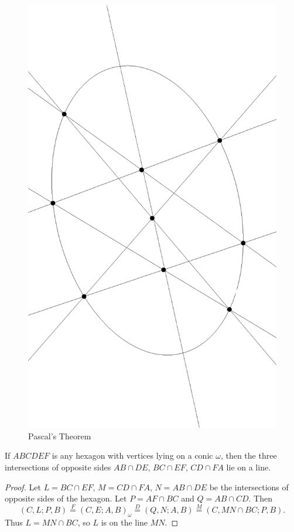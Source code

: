 \begin{figure}[!htb]
\centering
\includegraphics[scale=.5,angle=90]{pascal.eps}
\caption{Pascal's Theorem}
\end{figure}

\begin{thm} If $ABCDEF$ is any hexagon with vertices lying on a conic $\omega$, then the three intersections of opposite sides $AB\cap DE$, $BC\cap EF$, $CD\cap FA$ lie on a line.
\end{thm}
\begin{proof} Let $L = BC\cap EF$, $M = CD\cap FA$, $N = AB\cap DE$ be the intersections of opposite sides of the hexagon. Let $P = AF\cap BC$ and $Q = AB\cap CD$. Then
\[
(C,L;P,B) \stackrel{F}{=} (C,E;A,B)_{\omega} \stackrel{D}{=} (Q,N;A,B) \stackrel{M}{=} (C,MN\cap BC;P,B).
\]
Thus $L = MN\cap BC$, so $L$ is on the line $MN$.
\end{proof}

